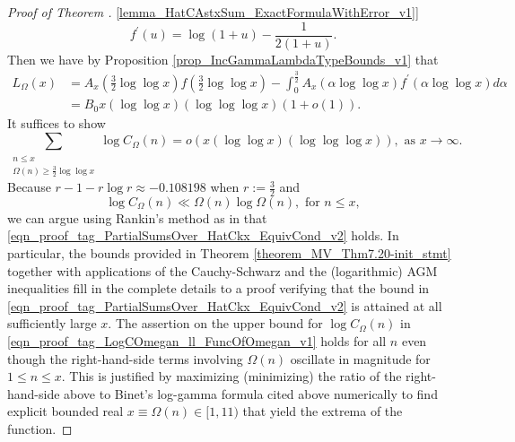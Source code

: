 \documentclass[11pt,reqno,a4letter]{article}
\newcommand{\hlocalref}[1]{\hyperref[#1]{\ref{#1}}}
\numberwithin{equation}{section}
\numberwithin{figure}{section}
\numberwithin{table}{section}
\theoremstyle{plain}
\numberwithin{theorem}{section}
\theoremstyle{definition}
\begin{document}
\begin{proof}[Proof of Theorem \hlocalref{lemma_HatCAstxSum_ExactFormulaWithError_v1}]
\[     f^{\prime}(u) = \log\left(1 + u\right) - \frac{1}{2\left(1 + u\right)}. 
\]
Then we have by 
Proposition \hlocalref{prop_IncGammaLambdaTypeBounds_v1} that 
\begin{align*}
L_{\Omega}(x) & = A_x\left(\frac{3}{2}\log\log x\right) f\left(\frac{3}{2}\log\log x\right) - 
	\int_0^{\frac{3}{2}} A_x(\alpha \log\log x) f^{\prime}(\alpha \log\log x) d\alpha \\ 
	& = 
	B_0 x (\log\log x)(\log\log\log x) \left(1 + o(1)\right). 
\end{align*}
It suffices to show 
\begin{equation}
\label{eqn_proof_tag_PartialSumsOver_HatCkx_EquivCond_v2}
\sum_{\substack{n \leq x \\ \Omega(n) \geq \frac{3}{2} \log\log x}} 
	\log C_{\Omega}(n)= o\left(x (\log\log x) (\log\log\log x)\right), 
	\text{ as } x \rightarrow \infty. 
\end{equation}
Because $r-1-r\log r \approx -0.108198$ when $r := \frac{3}{2}$ and 
\begin{equation}
\label{eqn_proof_tag_LogCOmegan_ll_FuncOfOmegan_v1}
\log C_{\Omega}(n) \ll \Omega(n) \log \Omega(n), \text{ for } n \leq x,
\end{equation}
we can argue using Rankin's method as in \cite[Thm.~7.20; \S 7.4]{MV} that 
\eqref{eqn_proof_tag_PartialSumsOver_HatCkx_EquivCond_v2} holds. 
In particular, the bounds provided in 
Theorem \hlocalref{theorem_MV_Thm7.20-init_stmt} 
together with applications of the Cauchy-Schwarz and 
the (logarithmic) AGM inequalities fill in the 
complete details to a proof verifying that the bound in 
\eqref{eqn_proof_tag_PartialSumsOver_HatCkx_EquivCond_v2} 
is attained at all sufficiently large $x$. 
The assertion on the upper bound for $\log C_{\Omega}(n)$ in 
\eqref{eqn_proof_tag_LogCOmegan_ll_FuncOfOmegan_v1} holds 
for all $n$ even though the right-hand-side terms involving $\Omega(n)$ 
oscillate in magnitude for $1 \leq n \leq x$. This is justified by 
maximizing (minimizing) the ratio of the right-hand-side above to 
Binet's log-gamma formula cited above 
numerically to find explicit bounded real $x \equiv \Omega(n) \in [1, 11)$ 
that yield the extrema of the function.
\end{proof} 
\end{document}
